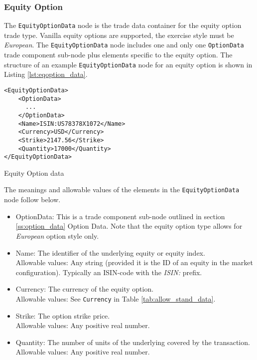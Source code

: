 \subsubsection{Equity Option}

The \lstinline!EquityOptionData!  node is the trade data container for the equity option trade type.  Vanilla equity 
options are supported, the exercise style must be \emph{European}. The \lstinline!EquityOptionData!  node includes one and 
only one \lstinline!OptionData! trade component sub-node plus elements specific to the equity option. The structure of 
an example \lstinline!EquityOptionData! node for an equity option is shown in Listing
\ref{lst:eqoption_data}.

\begin{listing}[H]
\begin{verbatim}
<EquityOptionData>
    <OptionData>
      ...
    </OptionData>
    <Name>ISIN:US78378X1072</Name>
    <Currency>USD</Currency>
    <Strike>2147.56</Strike>
    <Quantity>17000</Quantity>
</EquityOptionData>
\end{verbatim}
\caption{Equity Option data}
\label{lst:eqoption_data}
\end{listing}

The meanings and allowable values of the elements in the \lstinline!EquityOptionData!  node follow below.

\begin{itemize}
	\item OptionData: This is a trade component sub-node outlined in section \ref{ss:option_data} Option Data. Note 
	that the equity option type allows for \emph{European} option style only.	
	\item Name: The identifier of the underlying equity or equity index. \\
	Allowable values:  Any string (provided it is the ID of an equity in the market configuration). Typically an ISIN-code with the \emph{ISIN:} prefix.
	\item Currency: The currency of the equity option. \\
	Allowable values:  See \lstinline!Currency! in Table \ref{tab:allow_stand_data}.	
	\item Strike: The option strike price.\\
	Allowable values:  Any positive real number.	
	\item Quantity: The number of units of the underlying covered by the transaction. \\
	Allowable values:  Any positive real number.
\end{itemize}